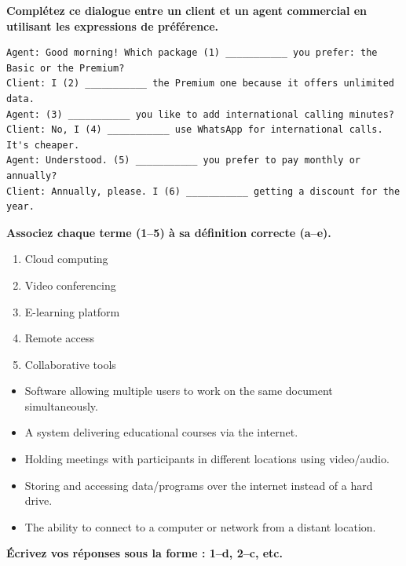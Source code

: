 \documentclass[11pt]{article}
\begin{document}
\begin{exercice}
\textbf{Complétez ce dialogue entre un client et un agent commercial en utilisant les expressions de préférence.}
\begin{verbatim}
Agent: Good morning! Which package (1) ___________ you prefer: the Basic or the Premium?
Client: I (2) ___________ the Premium one because it offers unlimited data.
Agent: (3) ___________ you like to add international calling minutes?
Client: No, I (4) ___________ use WhatsApp for international calls. It's cheaper.
Agent: Understood. (5) ___________ you prefer to pay monthly or annually?
Client: Annually, please. I (6) ___________ getting a discount for the year.
\end{verbatim}
\end{exercice}

\begin{exercice}
\textbf{Associez chaque terme (1--5) à sa définition correcte (a--e).}
\begin{enumerate}
    \item Cloud computing
    \item Video conferencing
    \item E-learning platform
    \item Remote access
    \item Collaborative tools
\end{enumerate}
\begin{itemize}
    \item[a)] Software allowing multiple users to work on the same document simultaneously.
    \item[b)] A system delivering educational courses via the internet.
    \item[c)] Holding meetings with participants in different locations using video/audio.
    \item[d)] Storing and accessing data/programs over the internet instead of a hard drive.
    \item[e)] The ability to connect to a computer or network from a distant location.
\end{itemize}
\textbf{Écrivez vos réponses sous la forme : 1--d, 2--c, etc.}
\end{exercice}
\end{document}
